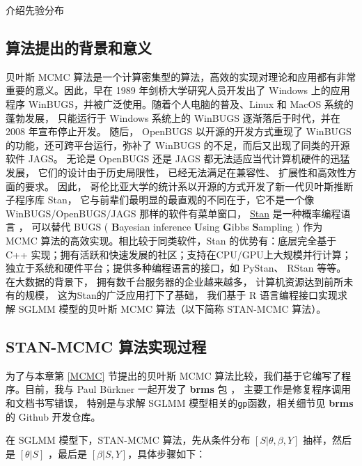 \documentclass[12pt,a4paper,UTF8,twoside]{book}
\theoremstyle{definition}
\theoremstyle{definition}
\theoremstyle{definition}
\theoremstyle{remark}
\begin{document}
介绍先验分布 \citep{SAS2017}

\subsection{算法提出的背景和意义}

贝叶斯 MCMC
算法是一个计算密集型的算法，高效的实现对理论和应用都有非常重要的意义。因此，早在
1989 年剑桥大学研究人员开发出了 Windows 上的应用程序
WinBUGS，并被广泛使用。随着个人电脑的普及、Linux 和 MacOS
系统的蓬勃发展， 只能运行于 Windows 系统上的 WinBUGS
逐渐落后于时代，并在 2008 年宣布停止开发。 随后， OpenBUGS
以开源的开发方式重现了 WinBUGS 的功能，还可跨平台运行，弥补了 WinBUGS
的不足，而后又出现了同类的开源软件 JAGS。 无论是 OpenBUGS 还是 JAGS
都无法适应当代计算机硬件的迅猛发展， 它们的设计由于历史局限性，
已经无法满足在兼容性、 扩展性和高效性方面的要求。 因此，
哥伦比亚大学的统计系以开源的方式开发了新一代贝叶斯推断子程序库 Stan，
它与前辈们最明显的最直观的不同在于，它不是一个像 WinBUGS/OpenBUGS/JAGS
那样的软件有菜单窗口， \href{http://mc-stan.org/}{Stan}
是一种概率编程语言 \citep{Stan2017JSS}， 可以替代 BUGS (
\textbf{B}ayesian inference \textbf{U}sing \textbf{G}ibbs
\textbf{S}ampling ) \citep{BUGS2009} 作为 MCMC
算法的高效实现。相比较于同类软件，Stan 的优势有：底层完全基于 C++
实现；拥有活跃和快速发展的社区；支持在CPU/GPU上大规模并行计算；独立于系统和硬件平台；提供多种编程语言的接口，如
PyStan、 RStan 等等。 在大数据的背景下，
拥有数千台服务器的企业越来越多， 计算机资源达到前所未有的规模，
这为Stan的广泛应用打下了基础， 我们基于 R 语言编程接口实现求解 SGLMM
模型的贝叶斯 MCMC 算法（以下简称 STAN-MCMC 算法）。

\hypertarget{STANMCMC}{%
\subsection{STAN-MCMC 算法实现过程}\label{STANMCMC}}

为了与本章第 \ref{MCMC} 节提出的贝叶斯 MCMC
算法比较，我们基于它编写了程序。目前，我与 Paul Bürkner 一起开发了
\textbf{brms} 包 \citep{brms2017JSS}，
主要工作是修复程序调用和文档书写错误， 特别是与求解 SGLMM
模型相关的\texttt{gp}函数，相关细节见 \textbf{brms} 的 Github 开发仓库。

在 SGLMM 模型下，STAN-MCMC 算法，先从条件分布 \([S|\theta,\beta,Y]\)
抽样，然后是 \([\theta|S]\) ，最后是 \([\beta|S,Y]\)，具体步骤如下：
\end{document}
